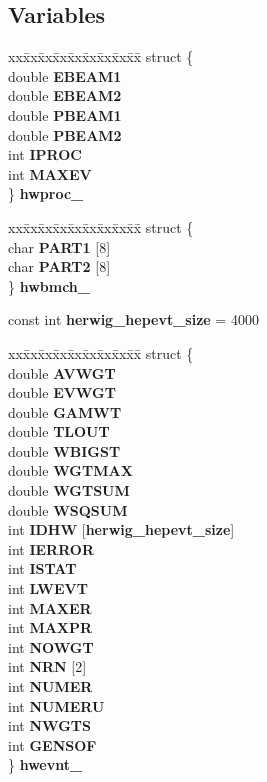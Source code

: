 \subsection*{Variables}
\begin{CompactItemize}
\item 
\begin{tabbing}
xx\=xx\=xx\=xx\=xx\=xx\=xx\=xx\=xx\=\kill
struct \{\\
\>double {\bf EBEAM1}\\
\>double {\bf EBEAM2}\\
\>double {\bf PBEAM1}\\
\>double {\bf PBEAM2}\\
\>int {\bf IPROC}\\
\>int {\bf MAXEV}\\
\} {\bf hwproc\_}\\

\end{tabbing}\item 
\begin{tabbing}
xx\=xx\=xx\=xx\=xx\=xx\=xx\=xx\=xx\=\kill
struct \{\\
\>char {\bf PART1} [8]\\
\>char {\bf PART2} [8]\\
\} {\bf hwbmch\_}\\

\end{tabbing}\item 
const int {\bf herwig\_\-hepevt\_\-size} = 4000
\item 
\begin{tabbing}
xx\=xx\=xx\=xx\=xx\=xx\=xx\=xx\=xx\=\kill
struct \{\\
\>double {\bf AVWGT}\\
\>double {\bf EVWGT}\\
\>double {\bf GAMWT}\\
\>double {\bf TLOUT}\\
\>double {\bf WBIGST}\\
\>double {\bf WGTMAX}\\
\>double {\bf WGTSUM}\\
\>double {\bf WSQSUM}\\
\>int {\bf IDHW} [{\bf herwig\_hepevt\_size}]\\
\>int {\bf IERROR}\\
\>int {\bf ISTAT}\\
\>int {\bf LWEVT}\\
\>int {\bf MAXER}\\
\>int {\bf MAXPR}\\
\>int {\bf NOWGT}\\
\>int {\bf NRN} [2]\\
\>int {\bf NUMER}\\
\>int {\bf NUMERU}\\
\>int {\bf NWGTS}\\
\>int {\bf GENSOF}\\
\} {\bf hwevnt\_}\\


\end{tabbing}
\end{CompactItemize}
